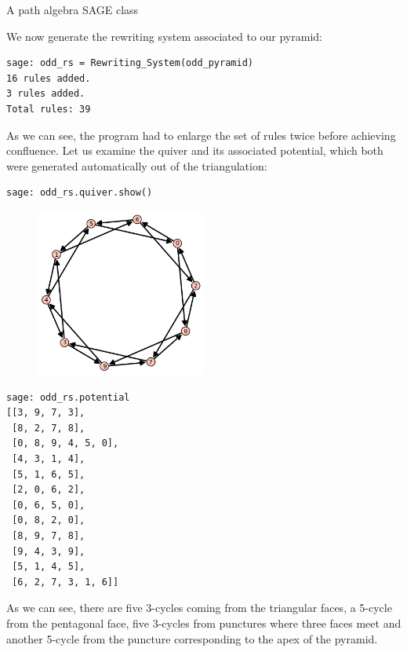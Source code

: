 \begin{chapter}{A path algebra SAGE class}
\begin{heur}
We now generate the rewriting system associated to our pyramid:
\end{heur}
\begin{lstlisting}
sage: odd_rs = Rewriting_System(odd_pyramid)
16 rules added.
3 rules added.
Total rules: 39
\end{lstlisting}
As we can see, the program had to enlarge the set of rules twice before achieving confluence. Let us examine the quiver and its associated potential, which both were generated automatically out of the triangulation:
\begin{lstlisting}
sage: odd_rs.quiver.show()
\end{lstlisting}
\begin{figure}[h]
\centering
\includegraphics[width=0.5\textwidth]{odd_quiver.png}
\end{figure}
\begin{lstlisting}
sage: odd_rs.potential
[[3, 9, 7, 3],
 [8, 2, 7, 8],
 [0, 8, 9, 4, 5, 0],
 [4, 3, 1, 4],
 [5, 1, 6, 5],
 [2, 0, 6, 2],
 [0, 6, 5, 0],
 [0, 8, 2, 0],
 [8, 9, 7, 8],
 [9, 4, 3, 9],
 [5, 1, 4, 5],
 [6, 2, 7, 3, 1, 6]]
\end{lstlisting}
As we can see, there are five 3-cycles coming from the triangular faces, a 5-cycle from the pentagonal face, five 3-cycles from punctures where three faces meet and another 5-cycle from the puncture corresponding to the apex of the pyramid.


\end{chapter}
